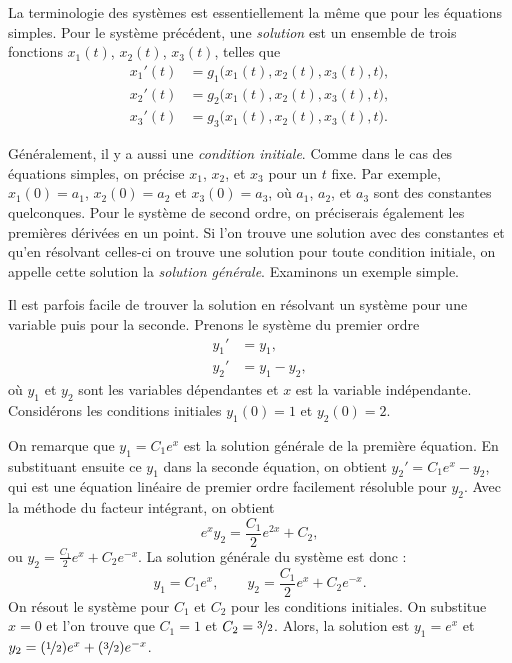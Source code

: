 La terminologie des systèmes est essentiellement la même que pour les équations simples. Pour le système précédent, une 
\emph{solution}
est un ensemble de trois fonctions $x_1(t)$, $x_2(t)$, $x_3(t)$, telles que
\begin{align*}
x_1'(t) &= g_1\bigl(x_1(t),x_2(t),x_3(t),t\bigr) , \\
x_2'(t) &= g_2\bigl(x_1(t),x_2(t),x_3(t),t\bigr) , \\
x_3'(t) &= g_3\bigl(x_1(t),x_2(t),x_3(t),t\bigr) .
\end{align*}

Généralement, il y a aussi une
\emph{condition initiale}.  Comme dans le cas des équations simples, on précise $x_1$, $x_2$, et $x_3$ pour un $t$ fixe.
Par exemple, $x_1(0) = a_1$, $x_2(0) = a_2$ et $x_3(0) = a_3$, où $a_1$, $a_2$, et $a_3$ sont des constantes quelconques. Pour le système de second ordre, on préciserais également les premières dérivées en un point. Si l'on trouve une solution avec des constantes et qu’en résolvant celles-ci on trouve une solution pour toute condition initiale, on appelle cette solution la \emph{solution générale}.
Examinons un exemple simple.

\begin{example}
Il est parfois facile de trouver la solution en résolvant un système pour une variable puis pour la seconde. Prenons le système du premier ordre
\begin{align*}
y_1' & = y_1 , \\
y_2' & = y_1 - y_2 ,
\end{align*}
où $y_1$ et $y_2$ sont les variables dépendantes et $x$ est la variable indépendante.  Considérons les conditions initiales 
$y_1(0) = 1$ et $y_2(0) = 2$.

On remarque que $y_1 = C_1 e^x$ est la solution générale de la première équation. En substituant ensuite ce $y_1$ dans la seconde équation, on obtient $y_2' = C_1e^x - y_2$, qui est une équation linéaire de premier ordre facilement résoluble pour $y_2$.  Avec la méthode du facteur intégrant, on obtient
\begin{equation*}
e^x y_2 = \frac{C_1}{2}e^{2x} + C_2 ,
\end{equation*}
ou $y_2 = \frac{C_1}{2}e^{x} + C_2e^{-x}$.  La solution générale du système est donc :
\begin{equation*}
y_1 = C_1 e^x , \qquad
y_2 = \frac{C_1}{2}e^{x} + C_2e^{-x} .
\end{equation*}
On résout le système pour $C_1$ et $C_2$ pour les conditions initiales. On substitue $x=0$ et l'on trouve que 
$C_1=1$ et $C_2=\nicefrac{3}{2}$.  Alors, la solution est
$y_1 = e^x$ et
$y_2 = (\nicefrac{1}{2}) e^x + (\nicefrac{3}{2}) e^{-x}$.
\end{example}

